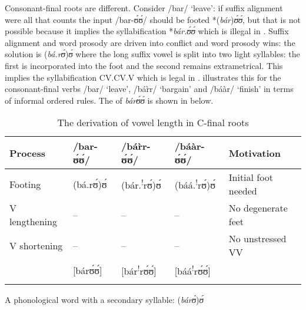 \documentclass[output=paper
,newtxmath
,modfonts
,nonflat]{langsci/langscibook}
\begin{document}
\z

Consonant-final roots are different. Consider /bar/ ‘leave’: if suffix alignment were all that counts the input /bar-ʊ́ʊ́/ should be footed *(\textit{bár})\textit{ʊ́ʊ́}, but that is not possible because it implies the syllabification *\textit{bá}\textit{r.ʊ́ʊ́} which is illegal in . Suffix alignment and word prosody are driven into conflict and word prosody wins: the solution is (\textit{bá.rʊ́})\textit{ʊ́} where the long suffix vowel is split into two light syllables: the first is incorporated into the foot and the second remains extrametrical. This implies the syllabification CV.CV.V which is legal in  \citep[3-4]{Kennedy1966}.  illustrates this for the consonant-final verbs /bar/ ‘leave’, /bár̀r/ ‘bargain’ and /báàr/ ‘finish’ in terms of informal ordered rules. The  of \textit{bárʊ́ʊ́} is shown in  below.

\begin{table}
\begin{tabularx}{\textwidth}{lllll}
\lsptoprule
{Process} & /bar-ʊ́ʊ́/ & /bá{r̀}r-ʊ́ʊ́/ & /báàr-ʊ́ʊ́/ & {Motivation}\\
\midrule
Footing & (bá.rʊ́)ʊ́ & (bár.\textsuperscript{!}rʊ́)ʊ́ & (báá.\textsuperscript{!}rʊ́)ʊ́ & Initial foot needed\\
V lengthening & -- & -- & -- & No degenerate feet\\
V shortening & -- & -- & -- & No unstressed VV\\
& [bárʊ́ʊ́] & [bár\textsuperscript{!}rʊ́ʊ́] & [báá\textsuperscript{!}rʊ́ʊ́] & \\
\lspbottomrule
\end{tabularx}
\caption{The derivation of vowel length in C-final roots}
\label{tab:anttila:13}
\end{table}
        
\ea\label{ex:anttila:2} A phonological word with a secondary syllable: (\textit{bárʊ́})\textit{ʊ́}
%
%
%
%
%
%        
        
\end{document}
